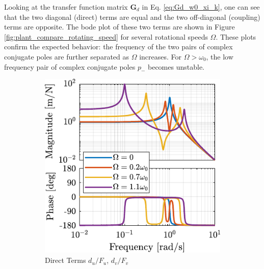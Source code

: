 \documentclass[Afour,sagev,times]{sagej}
\begin{document}
Looking at the transfer function matrix \(\bm{G}_d\) in Eq. \eqref{eq:Gd_w0_xi_k}, one can see that the two diagonal (direct) terms are equal and the two off-diagonal (coupling) terms are opposite.
The bode plot of these two terms are shown in Figure \ref{fig:plant_compare_rotating_speed} for several rotational speeds \(\Omega\).
These plots confirm the expected behavior: the frequency of the two pairs of complex conjugate poles are further separated as \(\Omega\) increases.
For \(\Omega > \omega_0\), the low frequency pair of complex conjugate poles \(p_{-}\) becomes unstable.

\begin{figure}[htbp]
\begin{subfigure}[c]{0.49\linewidth}
\includegraphics[width=\linewidth]{figs/plant_compare_rotating_speed_direct.pdf}
\caption{\label{fig:plant_compare_rotating_speed_direct} Direct Terms \(d_u/F_u\), \(d_v/F_v\)}
\end{subfigure}
\hfill
\begin{subfigure}[c]{0.49\linewidth}

\end{subfigure}
\end{figure}
\end{document}
